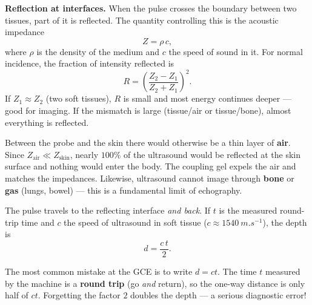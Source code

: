 \documentclass[11pt]{article}
\newcommand{\cle}[1]{{\popxbold\color{popdark}#1}}
\begin{document}
\textbf{Reflection at interfaces.} When the pulse crosses the boundary between two tissues, part of it is reflected. The quantity controlling this is the \cle{acoustic impedance}
\[ Z = \rho\, c, \]
where $\rho$ is the density of the medium and $c$ the speed of sound in it. For normal incidence, the fraction of intensity reflected is
\[ R = \left(\frac{Z_2 - Z_1}{Z_2 + Z_1}\right)^{2}. \]
If $Z_1 \approx Z_2$ (two soft tissues), $R$ is small and most energy continues deeper --- good for imaging. If the mismatch is large (tissue/air or tissue/bone), almost everything is reflected.

\begin{attention}
Between the probe and the skin there would otherwise be a thin layer of \textbf{air}. Since $Z_{\mathrm{air}} \ll Z_{\mathrm{skin}}$, nearly $100\%$ of the ultrasound would be reflected at the skin surface and nothing would enter the body. The \cle{coupling gel} expels the air and matches the impedances. Likewise, ultrasound cannot image through \textbf{bone} or \textbf{gas} (lungs, bowel) --- this is a fundamental limit of echography.
\end{attention}

\begin{propriete}
The pulse travels to the reflecting interface \emph{and back}. If $t$ is the measured round-trip time and $c$ the speed of ultrasound in soft tissue ($c \approx \SI{1540}{m.s^{-1}}$), the depth is
\[ d = \frac{c\,t}{2}. \]
\end{propriete}

\begin{attention}
The most common mistake at the GCE is to write $d = ct$. The time $t$ measured by the machine is a \textbf{round trip} (go \emph{and} return), so the one-way distance is only half of $ct$. Forgetting the factor $2$ doubles the depth --- a serious diagnostic error!
\end{attention}
\end{document}
